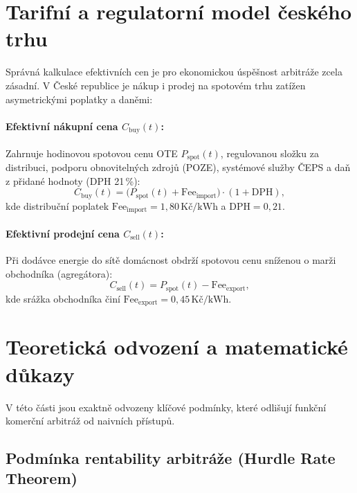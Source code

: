 \documentclass[FM,BP]{tulthesis}
\begin{document}
	\section{Tarifní a regulatorní model českého trhu}
	\label{sec:tarify}

	Správná kalkulace efektivních cen je pro ekonomickou úspěšnost arbitráže zcela zásadní. V České republice je nákup i prodej na spotovém trhu zatížen asymetrickými poplatky a daněmi:

	\paragraph{Efektivní nákupní cena $C_{\text{buy}}(t)$:}
	Zahrnuje hodinovou spotovou cenu OTE $P_{\text{spot}}(t)$, regulovanou složku za distribuci, podporu obnovitelných zdrojů (POZE), systémové služby ČEPS a daň z přidané hodnoty (DPH 21\,\%):
	\begin{equation}
		\label{eq:cbuy}
		C_{\text{buy}}(t) = \big( P_{\text{spot}}(t) + \text{Fee}_{\text{import}} \big) \cdot (1 + \text{DPH}),
	\end{equation}
	kde distribuční poplatek $\text{Fee}_{\text{import}} = 1{,}80\,\text{Kč/kWh}$ a $\text{DPH} = 0{,}21$.

	\paragraph{Efektivní prodejní cena $C_{\text{sell}}(t)$:}
	Při dodávce energie do sítě domácnost obdrží spotovou cenu sníženou o marži obchodníka (agregátora):
	\begin{equation}
		\label{eq:csell}
		C_{\text{sell}}(t) = P_{\text{spot}}(t) - \text{Fee}_{\text{export}},
	\end{equation}
	kde srážka obchodníka činí $\text{Fee}_{\text{export}} = 0{,}45\,\text{Kč/kWh}$.

	\section{Teoretická odvození a matematické důkazy}
	\label{sec:dukazy}

	V této části jsou exaktně odvozeny klíčové podmínky, které odlišují funkční komerční arbitráž od naivních přístupů.

	\subsection{Podmínka rentability arbitráže (Hurdle Rate Theorem)}
\end{document}
